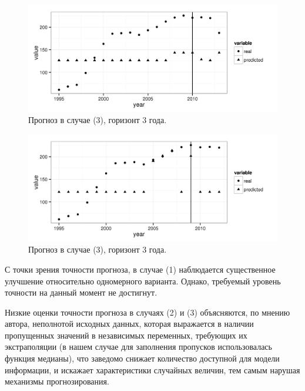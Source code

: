 \documentclass[a4paper,14pt]{article}
\begin{document}
\begin{figure}[bhtp]
	\begin{center}
		\includegraphics{images/m_plot2.png}
		\caption{Прогноз в случае (3), горизонт 3 года.}		
		\label{figure:m_plot2}
	\end{center}
\end{figure}

\begin{figure}[bhtp]
	\begin{center}
		\includegraphics{images/m_plot3.png}
		\caption{Прогноз в случае (3), горизонт 3 года.}		
		\label{figure:m_plot3}
	\end{center}
\end{figure}

С точки зрения точности прогноза, в случае (1) наблюдается существенное улучшение относительно
одномерного варианта. Однако, требуемый уровень точности на данный момент не достигнут.

Низкие оценки точности прогноза в случаях (2) и (3) объясняются, по мнению автора, неполнотой исходных данных, которая выражается в наличии пропущенных значений в независимых переменных, требующих их экстраполяции (в нашем случае для заполнения пропусков использовалась функция медианы), что заведомо снижает количество доступной для модели информации, и искажает характеристики случайных величин, тем самым нарушая механизмы прогнозирования.
\end{document}
